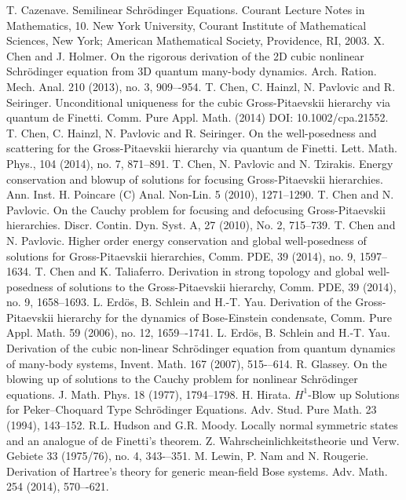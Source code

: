 \documentclass[reqno]{amsart}
\numberwithin{equation}{section}
\theoremstyle{remark}
\begin{document}
\begin{thebibliography}{9}
 T. Cazenave. Semilinear Schr\"odinger Equations.  Courant Lecture Notes in Mathematics, 10. New York University, Courant Institute of Mathematical Sciences, New York; American Mathematical Society, Providence, RI, 2003.
 X. Chen and J. Holmer.  On the rigorous derivation of the 2D cubic nonlinear Schr\"odinger equation from 3D quantum many-body dynamics. Arch. Ration. Mech. Anal. 210 (2013), no. 3, 909–-954.
 T. Chen, C. Hainzl, N. Pavlovic and R. Seiringer.  Unconditional uniqueness for the cubic Gross-Pitaevskii hierarchy via quantum de Finetti.  Comm. Pure Appl. Math. (2014) DOI: 10.1002/cpa.21552.
 T. Chen, C. Hainzl, N. Pavlovic and R. Seiringer.  On the well-posedness and scattering for the Gross-Pitaevskii hierarchy via quantum de Finetti.  Lett. Math. Phys., 104 (2014), no. 7, 871--891. 
 T. Chen, N. Pavlovic and N. Tzirakis. Energy conservation and blowup of solutions for focusing Gross-Pitaevskii hierarchies. Ann. Inst. H. Poincare (C) Anal. Non-Lin. 5 (2010), 1271--1290.
 T. Chen and N. Pavlovic.  On the Cauchy problem for focusing and defocusing Gross-Pitaevskii hierarchies.  Discr. Contin. Dyn. Syst. A, 27 (2010), No. 2, 715--739.
 T. Chen and N. Pavlovic. Higher order energy conservation and global well-posedness of solutions for Gross-Pitaevskii hierarchies, Comm. PDE, 39 (2014), no. 9, 1597--1634.
 T. Chen and K. Taliaferro.  Derivation in strong topology and global well-posedness of solutions to the Gross-Pitaevskii hierarchy, Comm. PDE, 39 (2014), no. 9, 1658--1693.
 L. Erd\"os, B. Schlein and H.-T. Yau. Derivation of the Gross-Pitaevskii hierarchy for the dynamics of Bose-Einstein condensate, Comm. Pure Appl. Math. 59 (2006), no. 12, 1659–-1741.
 L. Erd\"os, B. Schlein and H.-T. Yau. Derivation of the cubic non-linear Schr\"odinger equation from quantum dynamics of many-body systems, Invent. Math. 167 (2007), 515-–614.
 R. Glassey. On the blowing up of solutions to the Cauchy problem for nonlinear Schr\"odinger equations. J. Math. Phys. 18 (1977), 1794--1798.
 H. Hirata.  $H^1$-Blow up Solutions for Peker--Choquard Type Schr\"odinger Equations.  Adv. Stud. Pure Math. 23 (1994), 143--152.
 R.L. Hudson and G.R. Moody.  Locally normal symmetric states and an analogue of de Finetti's theorem. Z. Wahrscheinlichkeitstheorie und Verw. Gebiete 33 (1975/76), no. 4, 343-–351.
 M. Lewin, P. Nam and N. Rougerie.  Derivation of Hartree's theory for generic mean-field Bose systems. Adv. Math. 254 (2014), 570–-621. 

\end{thebibliography}
\end{document}
